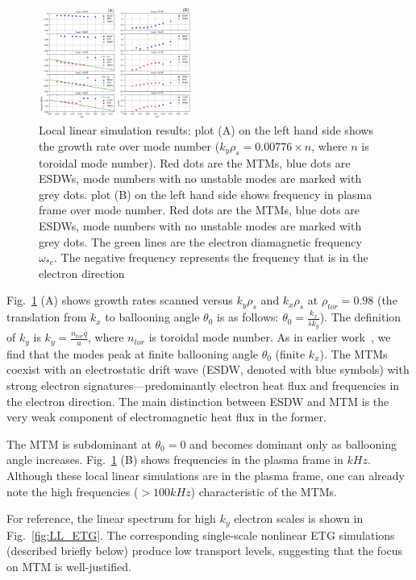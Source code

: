 \documentclass[
 aip,
 amsmath,amssymb,
 reprint
]{revtex4-1}
\begin{document}
\begin{figure}[h]
        \includegraphics[width=0.45\textwidth]{4.png}
        \centering
        \caption[font=5]{Local linear simulation results: plot (A) on the left hand side shows the growth rate over mode number ($k_y\rho_s=0.00776\times n$, where $n$ is toroidal mode number). Red dots are the MTMs, blue dots are ESDWs, mode numbers with no unstable modes are marked with grey dots. 
        plot (B) on the left hand side shows frequency in plasma frame over mode number. Red dots are the MTMs, blue dots are ESDWs, mode numbers with no unstable modes are marked with grey dots. The green lines are the electron diamagnetic frequency $\omega_{*e}$. The negative frequency represents the frequency that is in the electron direction}
        \label{fig:LL_f_gamma}
\end{figure}


Fig.~\ref{fig:LL_f_gamma} (A) shows growth rates scanned versus $k_y \rho_s$ and $k_x \rho_s$ at $\rho_{tor}=0.98$ (the translation from $k_x$ to ballooning angle $\theta_0$ is as follows: $\theta_0=\frac{k_x}{\hat{s}k_y}$). The definition of $k_y$ is $k_y=\frac{n_{tor} q}{a}$, where $n_{tor}$ is toroidal mode number. As in earlier work~\cite{Hatch_2016, Ehab_MTM}, we find that the modes peak at finite ballooning angle $\theta_0$ (finite $k_x$).  The MTMs coexist with an electrostatic drift wave (ESDW, denoted with blue symbols) with strong electron signatures---predominantly electron heat flux and frequencies in the electron direction.  The main distinction between ESDW and MTM is the very weak component of electromagnetic heat flux in the former. 


The MTM is subdominant at $\theta_0 = 0$ and becomes dominant only as ballooning angle increases.  Fig.~\ref{fig:LL_f_gamma} (B) shows frequencies in the plasma frame in $kHz$.  
Although these local linear simulations are in the plasma frame, one can already note the high frequencies ($>100kHz$) characteristic of the MTMs.

For reference, the linear spectrum for high $k_y$ electron scales is shown in Fig.~\ref{fig:LL_ETG}.  The corresponding single-scale nonlinear ETG simulations (described briefly below) produce low transport levels, suggesting that the focus on MTM is well-justified.  
\end{document}
